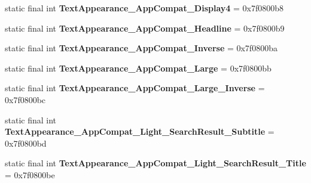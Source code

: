 \begin{DoxyCompactItemize}
\item 
\hypertarget{classandroid_1_1support_1_1v7_1_1appcompat_1_1_r_1_1style_af6a39a4f5ad54f4ff593b4c4e118b1ec}{}static final int {\bfseries Text\+Appearance\+\_\+\+App\+Compat\+\_\+\+Display4} = 0x7f0800b8\label{classandroid_1_1support_1_1v7_1_1appcompat_1_1_r_1_1style_af6a39a4f5ad54f4ff593b4c4e118b1ec}

\item 
\hypertarget{classandroid_1_1support_1_1v7_1_1appcompat_1_1_r_1_1style_aa40c94de107d982632d5f5cefb8af742}{}static final int {\bfseries Text\+Appearance\+\_\+\+App\+Compat\+\_\+\+Headline} = 0x7f0800b9\label{classandroid_1_1support_1_1v7_1_1appcompat_1_1_r_1_1style_aa40c94de107d982632d5f5cefb8af742}

\item 
\hypertarget{classandroid_1_1support_1_1v7_1_1appcompat_1_1_r_1_1style_a3b1f6191b46f580988a5d7ce1be8442e}{}static final int {\bfseries Text\+Appearance\+\_\+\+App\+Compat\+\_\+\+Inverse} = 0x7f0800ba\label{classandroid_1_1support_1_1v7_1_1appcompat_1_1_r_1_1style_a3b1f6191b46f580988a5d7ce1be8442e}

\item 
\hypertarget{classandroid_1_1support_1_1v7_1_1appcompat_1_1_r_1_1style_a0f7c87ccc9f28664a827645d6c661adb}{}static final int {\bfseries Text\+Appearance\+\_\+\+App\+Compat\+\_\+\+Large} = 0x7f0800bb\label{classandroid_1_1support_1_1v7_1_1appcompat_1_1_r_1_1style_a0f7c87ccc9f28664a827645d6c661adb}

\item 
\hypertarget{classandroid_1_1support_1_1v7_1_1appcompat_1_1_r_1_1style_a1cd2cf2f498da3bce4450a09defe45cb}{}static final int {\bfseries Text\+Appearance\+\_\+\+App\+Compat\+\_\+\+Large\+\_\+\+Inverse} = 0x7f0800bc\label{classandroid_1_1support_1_1v7_1_1appcompat_1_1_r_1_1style_a1cd2cf2f498da3bce4450a09defe45cb}

\item 
\hypertarget{classandroid_1_1support_1_1v7_1_1appcompat_1_1_r_1_1style_a2c3168595fbf5a2f2cd9d11b7f45ad30}{}static final int {\bfseries Text\+Appearance\+\_\+\+App\+Compat\+\_\+\+Light\+\_\+\+Search\+Result\+\_\+\+Subtitle} = 0x7f0800bd\label{classandroid_1_1support_1_1v7_1_1appcompat_1_1_r_1_1style_a2c3168595fbf5a2f2cd9d11b7f45ad30}

\item 
\hypertarget{classandroid_1_1support_1_1v7_1_1appcompat_1_1_r_1_1style_a62fb7764d0faa33424e637094f9874ed}{}static final int {\bfseries Text\+Appearance\+\_\+\+App\+Compat\+\_\+\+Light\+\_\+\+Search\+Result\+\_\+\+Title} = 0x7f0800be\label{classandroid_1_1support_1_1v7_1_1appcompat_1_1_r_1_1style_a62fb7764d0faa33424e637094f9874ed}


\end{DoxyCompactItemize}
